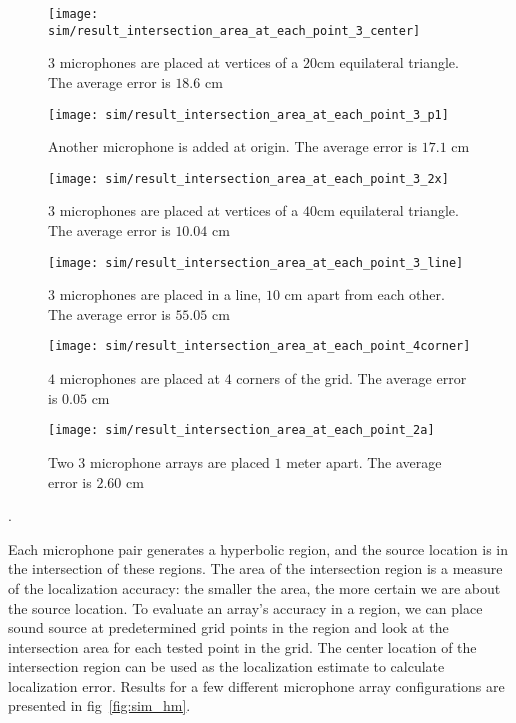 \begin{figure*}[]
  \centering
  \begin{subfigure}[]{.48\textwidth}
    \texttt{[image: sim/result\_intersection\_area\_at\_each\_point\_3\_center]}
    \caption{$3$ microphones are placed at vertices of a $20$cm equilateral triangle. The average error is $18.6$ cm}
    \label{fig:sim_hm_3}
  \end{subfigure}
  \begin{subfigure}[]{.48\textwidth}
    \texttt{[image: sim/result\_intersection\_area\_at\_each\_point\_3\_p1]}
    \caption{Another microphone is added at origin. The average error is $17.1$ cm}
    \label{fig:sim_hm_3_p1}
  \end{subfigure}
  \begin{subfigure}[]{.48\textwidth}
    \texttt{[image: sim/result\_intersection\_area\_at\_each\_point\_3\_2x]}
    \caption{$3$ microphones are placed at vertices of a $40$cm equilateral triangle. The average error is $10.04$ cm}
    \label{fig:sim_hm_3_2x}
  \end{subfigure}
  \begin{subfigure}[]{.48\textwidth}
    \texttt{[image: sim/result\_intersection\_area\_at\_each\_point\_3\_line]}
    \caption{$3$ microphones are placed in a line, $10$ cm apart from each other. The average error is $55.05$ cm}
    \label{fig:sim_hm_3_line}
  \end{subfigure}
  \begin{subfigure}[]{.48\textwidth}
    \texttt{[image: sim/result\_intersection\_area\_at\_each\_point\_4corner]}
    \caption{$4$ microphones are placed at $4$ corners of the grid. The average error is $0.05$ cm}
    \label{fig:sim_hm_4}
  \end{subfigure}
  \begin{subfigure}[]{.48\textwidth}
    \texttt{[image: sim/result\_intersection\_area\_at\_each\_point\_2a]}
    \caption{Two $3$ microphone arrays are placed $1$ meter apart. The average error is $2.60$ cm}
    \label{fig:sim_hm_2_array}
  \end{subfigure}
  \caption{Error heatmap for different array configurations. The heatmap scale is the intersection area measured in $cm^2$}.
  \label{fig:sim_hm}
\end{figure*}

Each microphone pair generates a hyperbolic region, and the source location is in the intersection of these regions. The area of the intersection region is a measure of the localization accuracy: the smaller the area, the more certain we are about the source location. To evaluate an array's accuracy in a region, we can place sound source at predetermined grid points in the region and look at the intersection area for each tested point in the grid. The center location of the intersection region can be used as the localization estimate to calculate localization error. Results for a few different microphone array configurations are presented in fig~\ref{fig:sim_hm}.

